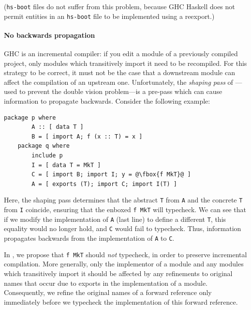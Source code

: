 (\verb|hs-boot| files do not suffer from this problem, because GHC
Haskell does not permit entities in an \verb|hs-boot| file to be implemented
using a reexport.)

\paragraph{No backwards propagation}
GHC is an incremental compiler: if you edit a module of a previously
compiled project, only modules which transitively import it need to be
recompiled.  For this strategy to be correct, it must not be the case
that a downstream module can affect the compilation of an upstream one.
Unfortunately, the \emph{shaping pass} of \OldBackpack{}---used to
prevent the double vision problem---is a pre-pass
which can cause information to propagate backwards.  Consider the
following example:

\begin{lstlisting}[escapechar=@]
    package p where
        A :: [ data T ]
        B = [ import A; f (x :: T) = x ]
    package q where
        include p
        I = [ data T = MkT ]
        C = [ import B; import I; y = @\fbox{f MkT}@ ]
        A = [ exports (T); import C; import I(T) ]
\end{lstlisting}
%
Here, the shaping pass determines that the abstract \verb|T| from
\verb|A| and the concrete \verb|T| from \verb|I| coincide, ensuring that
the enboxed \verb|f MkT| will typecheck.  We can see that if we
modify the implementation of \verb|A| (last line) to define a different
\verb|T|, this equality would no longer hold, and \verb|C| would
fail to typecheck.  Thus, information propagates backwards from
the implementation of \verb|A| to \verb|C|.

In \Backpack{}, we propose that \verb|f MkT| should \emph{not}
typecheck, in order to preserve incremental compilation.  More
generally, only the implementor of a module and any modules which
transitively import it should be affected by any refinements to original
names that occur due to exports in the implementation of a module.
Consequently, we refine the original names of a forward reference only
immediately before we typecheck the implementation of this forward
reference.


